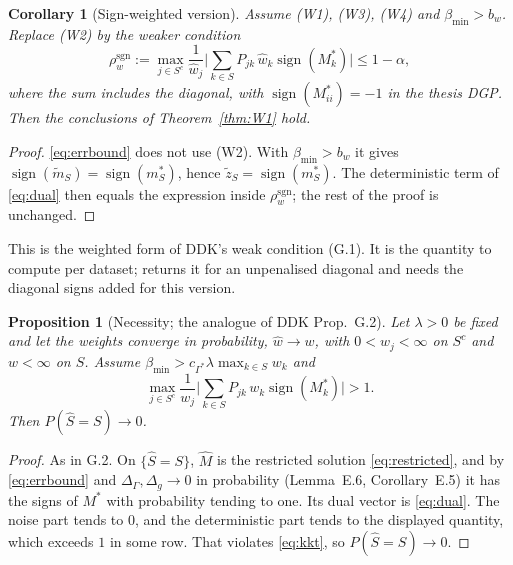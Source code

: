 \documentclass[11pt,a4paper]{article}
\numberwithin{equation}{section}
\theoremstyle{plain}
\newtheorem{corollary}[theorem]{Corollary}
\newtheorem{proposition}[theorem]{Proposition}
\theoremstyle{remark}
\DeclareMathOperator{\sign}{sign}
\begin{document}
\begin{corollary}[Sign-weighted version]\label{cor:W4}
Assume (W1), (W3), (W4) and $\beta_{\min}>b_w$. Replace (W2) by the weaker condition
\[
\rho_w^{\mathrm{sgn}}:=\max_{j\in S^c}\frac{1}{\hat w_j}\Big|\sum_{k\in S}P_{jk}\,\hat w_k\sign(M^*_k)\Big|\le1-\alpha ,
\]
where the sum includes the diagonal, with $\sign(M^*_{ii})=-1$ in the thesis DGP. Then the conclusions of Theorem~\ref{thm:W1} hold.
\end{corollary}

\begin{proof}
\eqref{eq:errbound} does not use (W2). With $\beta_{\min}>b_w$ it gives $\sign(\tilde m_S)=\sign(m^*_S)$, hence $\tilde z_S=\sign(m^*_S)$. The deterministic term of \eqref{eq:dual} then equals the expression inside $\rho_w^{\mathrm{sgn}}$; the rest of the proof is unchanged.
\end{proof}

This is the weighted form of DDK's weak condition (G.1). It is the quantity to compute per dataset;  returns it for an unpenalised diagonal and needs the diagonal signs added for this version.

\begin{proposition}[Necessity; the analogue of DDK Prop.~G.2]\label{prop:W5}
Let $\lambda>0$ be fixed and let the weights converge in probability, $\hat w\to w$, with $0<w_j<\infty$ on $S^c$ and $w<\infty$ on $S$. Assume $\beta_{\min}>c_{\Gamma^*}\lambda\max_{k\in S}w_k$ and
\[
\max_{j\in S^c}\frac{1}{w_j}\Big|\sum_{k\in S}P_{jk}\,w_k\sign(M^*_k)\Big|>1 .
\]
Then $P(\hat S=S)\to0$.
\end{proposition}

\begin{proof}
As in G.2. On $\{\hat S=S\}$, $\hat M$ is the restricted solution \eqref{eq:restricted}, and by \eqref{eq:errbound} and $\Delta_\Gamma,\Delta_g\to0$ in probability (Lemma~E.6, Corollary~E.5) it has the signs of $M^*$ with probability tending to one. Its dual vector is \eqref{eq:dual}. The noise part tends to $0$, and the deterministic part tends to the displayed quantity, which exceeds $1$ in some row. That violates \eqref{eq:kkt}, so $P(\hat S=S)\to0$.
\end{proof}
\end{document}
